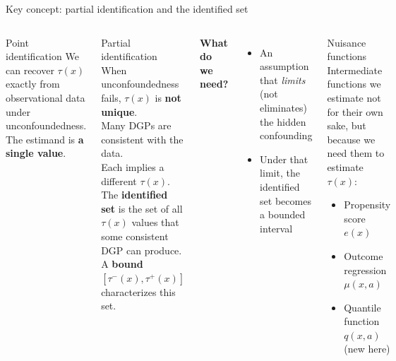 \documentclass[aspectratio=169]{beamer}
\begin{document}
\begin{frame}{Key concept: partial identification and the identified set}

\begin{columns}
\begin{block}{Point identification}
We can recover $\tau(x)$ exactly from observational data under unconfoundedness. The estimand is \textbf{a single value}.
\end{block}

\vspace{0.4em}
\begin{alertblock}{Partial identification}
When unconfoundedness fails, $\tau(x)$ is \textbf{not unique}.\\
Many DGPs are consistent with the data.\\
Each implies a different $\tau(x)$.\\[4pt]
The \textbf{identified set} is the set of all $\tau(x)$ values that some consistent DGP can produce.\\
A \textbf{bound} $[\tau^-(x), \tau^+(x)]$ characterizes this set.
\end{alertblock}

\textbf{What do we need?}
\begin{itemize}
  \item An assumption that \emph{limits} (not eliminates) the hidden confounding
  \item Under that limit, the identified set becomes a bounded interval
\end{itemize}

\vspace{0.4em}
\begin{block}{Nuisance functions}
Intermediate functions we estimate not for their own sake, but because we need them to estimate $\tau(x)$:
\begin{itemize}\small
  \item Propensity score $e(x)$
  \item Outcome regression $\mu(x,a)$
  \item Quantile function $q(x,a)$ (new here)
\end{itemize}
\end{block}
\end{columns}
\end{frame}

\end{document}
